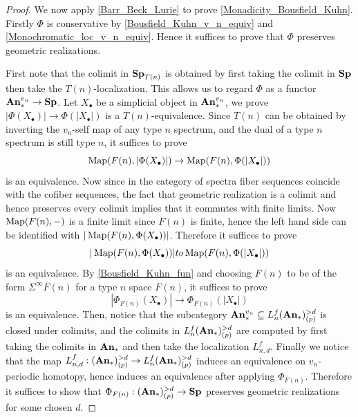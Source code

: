 	\begin{proof}
		We now apply \cref{Barr_Beck_Lurie} to prove \cref{Monadicity_Bousfield_Kuhn}. Firstly $\Phi$ is conservative by \cref{Bousfield_Kuhn_v_n_equiv} and \cref{Monochromatic_loc_v_n_equiv}. Hence it suffices to prove that $\Phi$ preserves geometric realizations. 

		First note that the colimit in $\mathbf{Sp}_{T(n)}$ is obtained by first taking the colimit in $\mathbf{Sp}$ then take the $T(n)$-localization. This allows us to regard $\Phi$ as a functor $\mathbf{An}_*^{v_n}\to\mathbf{Sp}$. Let $X_\bullet$ be a simplicial object in $\mathbf{An}_*^{v_n}$, we prove $|\Phi(X_\bullet)|\to\Phi(|X_\bullet|)$ is a $T(n)$-equivalence. Since $T(n)$ can be obtained by inverting the $v_n$-self map of any type $n$ spectrum, and the dual of a type $n$ spectrum is still type $n$, it suffices to prove 
		\[ \operatorname{\mathrm{Map}}(F(n),|\Phi(X_\bullet)|)\to\operatorname{\mathrm{Map}}(F(n),\Phi(|X_\bullet|)) \] 
		is an equivalence. Now since in the category of spectra fiber sequences coincide with the cofiber sequences, the fact that geometric realization is a colimit and hence preserves every colimit implies that it commutes with finite limits. Now $\operatorname{\mathrm{Map}}(F(n),-)$ is a finite limit since $F(n)$ is finite, hence the left hand side can be identified with $|\operatorname{\mathrm{Map}}(F(n),\Phi(X_\bullet))|$. Therefore it suffices to prove 
		\[ |\operatorname{\mathrm{Map}}(F(n),\Phi(X_\bullet))|to\operatorname{\mathrm{Map}}(F(n),\Phi(|X_\bullet|)) \]
		is an equivalence. By \cref{Bousfield_Kuhn_fun} and choosing $F(n)$ to be of the form $\Sigma^\infty F(n)$ for a type $n$ space $F(n)$, it suffices to prove 
		\[ |\Phi_{F(n)}(X_\bullet)|\to\Phi_{F(n)}(|X_\bullet|) \]
		is an equivalence. Then, notice that the subcategory $\mathbf{An}_*^{v_n}\subseteq L_n^f(\mathbf{An}_*)_{(p)}^{>d}$ is closed under colimits, and the colimits in $L_n^f(\mathbf{An}_*)_{(p)}^{>d}$ are computed by first taking the colimits in $\mathbf{An}_*$ and then take the localization $L_{n,d}^f$. Finally we notice that the map $L_{n,d}^f:(\mathbf{An}_*)_{(p)}^{>d}\to L_n^f(\mathbf{An}_*)_{(p)}^{>d}$ induces an equivalence on $v_n$-periodic homotopy, hence induces an equivalence after applying $\Phi_{F(n)}$. Therefore it suffices to show that $\Phi_{F(n)}:(\mathbf{An}_*)_{(p)}^{>d}\to\mathbf{Sp}$ preserves geometric realizations for some chosen $d$. 


\end{proof}
